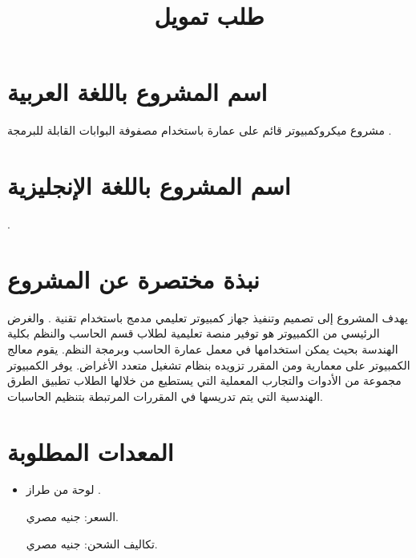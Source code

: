 \documentclass[arabic]{article}
\title{\Huge{طلب تمويل}}
\date{\vspace{-5ex}}
\begin{document}
\maketitle


\section{اسم المشروع باللغة العربية}

مشروع ميكروكمبيوتر قائم على عمارة
باستخدام مصفوفة البوابات القابلة للبرمجة
.

\section{اسم المشروع باللغة الإنجليزية}

.

\section{نبذة مختصرة عن المشروع}

يهدف المشروع إلى تصميم وتنفيذ جهاز كمبيوتر تعليمي مدمج باستخدام تقنية
.
والغرض الرئيسي من الكمبيوتر هو توفير منصة تعليمية لطلاب قسم الحاسب والنظم
بكلية الهندسة بحيث
يمكن استخدامها في معمل عمارة الحاسب وبرمجة النظم.
يقوم معالج الكمبيوتر على معمارية
ومن المقرر تزويده بنظام تشغيل متعدد الأغراض.
يوفر الكمبيوتر مجموعة من الأدوات والتجارب المعملية التي يستطيع من خلالها الطلاب
تطبيق الطرق الهندسية التي يتم تدريسها في المقررات المرتبطة بتنظيم الحاسبات.
\section{المعدات المطلوبة}

\begin{itemize}
\item
لوحة
من طراز
.

السعر:
جنيه مصري.

تكاليف الشحن:
جنيه مصري.

\end{itemize}
\end{document}
